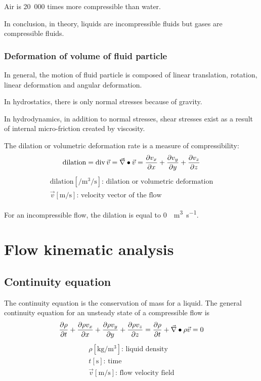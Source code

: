 \documentclass[10pt, twocolumn]{article}
\begin{document}
\begin{remark}
  Air is 20~000 times more compressible than water.
\end{remark}

In conclusion, in theory, liquids are incompressible fluids but gases are compressible fluids.


\subsubsection{Deformation of volume of fluid particle}
In general, the motion of fluid particle is composed of linear translation, rotation, linear deformation and angular deformation.

In hydrostatics, there is only normal stresses because of gravity.

In hydrodynamics, in addition to normal stresses, shear stresses exist as a result of internal micro-friction created by viscosity.

The dilation or volumetric deformation rate is a measure of compressibility:
\[
  \mathrm{dilation} = \mathrm{div}\,\vec{v} = \vec{\nabla} \bullet \vec{v} = \frac{\partial v_x}{\partial x} + \frac{\partial v_y}{\partial y} + \frac{\partial v_z}{\partial z}
\]
\[
  \begin{array}{|l}
    \mathrm{dilation} [\si{\per\metre\cubed\per\second}] \text{: dilation or volumetric deformation} \\
    \vec{v} [\si{\metre\per\second}] \text{: velocity vector of the flow}
  \end{array}
\]

\begin{remark}
  For an incompressible flow, the dilation is equal to \SI{0}{\per\metre\cubed\per\second}.
\end{remark}



\section{Flow kinematic analysis}
\subsection{Continuity equation}
The continuity equation is the conservation of mass for a liquid.
The general continuity equation for an unsteady state of a compressible flow is
\[
  \frac{\partial \rho}{\partial t} + \frac{\partial \rho v_x}{\partial x} + \frac{\partial \rho v_y}{\partial y} + \frac{\partial \rho v_z}{\partial z} = \frac{\partial \rho}{\partial t} + \vec{\nabla} \bullet \rho\vec{v} = 0
\]
\[
  \begin{array}{|l}
    \rho [\si{\kilogram\per\metre\cubed}] \text{: liquid density} \\
    t [\si{\second}] \text{: time}                                \\
    \vec{v} [\si{\metre\per\second}] \text{: flow velocity field}
  \end{array}
\]
\end{document}
